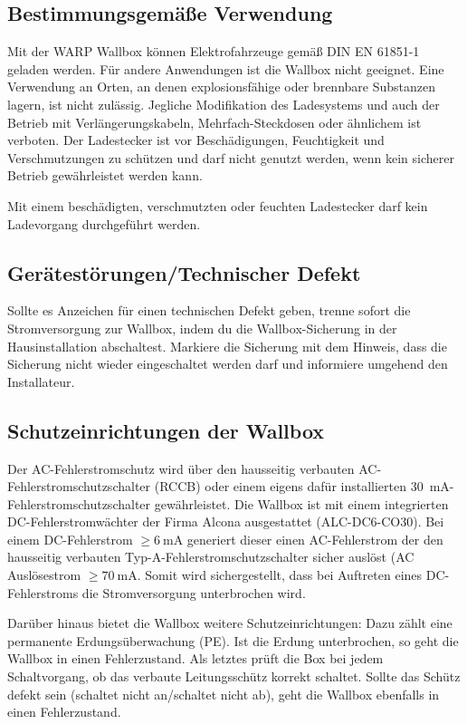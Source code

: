 \documentclass[a4paper,10pt]{article}
\newcommand{\hint}[1]{\begin{tcolorbox}[colback=boxgray,colframe=black,coltext=
white,title=Hinweis]#1\end{tcolorbox}}
\begin{document}
\begin{multicols*}{2}
	\subsection{Bestimmungsgemäße Verwendung}
	Mit der WARP Wallbox können Elektrofahrzeuge gemäß DIN EN 61851-1 geladen
	werden. Für andere Anwendungen ist die Wallbox nicht geeignet. Eine Verwendung
	an Orten, an denen explosionsfähige oder brennbare Substanzen lagern, ist nicht
	zulässig. Jegliche Modifikation des Ladesystems und auch der Betrieb mit
	Verlängerungskabeln, Mehrfach-Steckdosen oder ähnlichem ist verboten. Der
	Ladestecker ist vor Beschädigungen, Feuchtigkeit und Verschmutzungen zu
	schützen und darf nicht genutzt werden, wenn kein sicherer Betrieb
	gewährleistet werden kann. \hint{Mit einem beschädigten, verschmutzten oder feuchten Ladestecker darf kein Ladevorgang durchgeführt
		werden.}

	\subsection{Gerätestörungen/Technischer Defekt}
	Sollte es Anzeichen für einen technischen Defekt geben, trenne sofort die
	Stromversorgung zur Wallbox, indem du die Wallbox-Sicherung in der
	Hausinstallation abschaltest. Markiere die Sicherung mit dem Hinweis, dass die
	Sicherung nicht wieder eingeschaltet werden darf und informiere umgehend den
	Installateur.

	\subsection{Schutzeinrichtungen der Wallbox}
	Der AC-Fehlerstromschutz wird über den hausseitig verbauten
	AC-Fehlerstromschutzschalter (RCCB) oder einem eigens dafür installierten
	\SI{30}{\milli\ampere}-Fehlerstromschutzschalter gewährleistet. Die Wallbox ist
	mit einem integrierten DC-Fehlerstromwächter der Firma Alcona ausgestattet
	(ALC-DC6-CO30). Bei einem DC-Fehlerstrom $\geq \SI{6}{\milli\ampere}$ generiert dieser
	einen AC-Fehlerstrom der den hausseitig verbauten
	Typ-A-Fehlerstromschutzschalter sicher auslöst (AC Auslösestrom
	$\geq \SI{70}{\milli\ampere}$. Somit wird sichergestellt, dass bei Auftreten eines
	DC-Fehlerstroms die Stromversorgung unterbrochen wird.

	Darüber hinaus bietet die Wallbox weitere Schutzeinrichtungen: Dazu zählt eine
	permanente Erdungsüberwachung (PE). Ist die Erdung unterbrochen, so geht die
	Wallbox in einen Fehlerzustand. Als letztes prüft die Box bei jedem
	Schaltvorgang, ob das verbaute Leitungsschütz korrekt schaltet. Sollte das
	Schütz defekt sein (schaltet nicht an/schaltet nicht ab), geht die Wallbox
	ebenfalls in einen Fehlerzustand.


\end{multicols*}
\end{document}
